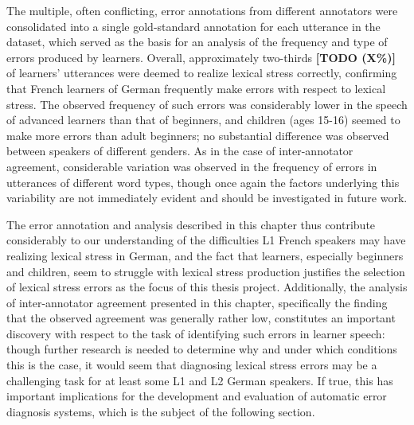\documentclass[11pt,a4paper,onecolumn]{article}
\newcommand{\TODO}[1]{{\color{red}\textbf{[TODO #1]}}}
\begin{document}
	The multiple, often conflicting, error annotations from different annotators were consolidated into a single gold-standard annotation for each utterance in the dataset, %
	which served as the basis for an analysis of the frequency and type of errors produced by learners. %
	Overall, approximately two-thirds \TODO{(X\%)} of learners' utterances were deemed to realize lexical stress correctly, confirming that French learners of German frequently make errors with respect to lexical stress. %
	The observed frequency of such errors was considerably lower in the speech of advanced learners than that of beginners, %
	and children (ages 15-16) seemed to make more errors than adult beginners; %
	no substantial difference was observed between speakers of different genders. 
	As in the case of inter-annotator agreement, considerable variation was observed in the frequency of errors in utterances of different word types, %
	though once again the factors underlying this variability are not immediately evident and should be investigated in future work. %
	
	The error annotation and analysis described in this chapter thus contribute considerably to our understanding of the difficulties L1 French speakers may have realizing lexical stress in 
	German, 
	and the fact that learners, especially beginners and children, seem to struggle with lexical stress production justifies the selection of lexical stress errors as the focus of this thesis project. Additionally, the analysis of inter-annotator agreement presented in this chapter, specifically the finding that the observed agreement was generally rather low,
	constitutes an important discovery with respect to the task of identifying such errors in learner speech:
	though further research is needed to determine why and under which conditions this is the case, %
	it would seem that diagnosing lexical stress errors may be a challenging task for at least some L1 and L2 German speakers. If true, this has important implications for the development and evaluation of automatic error diagnosis systems, 
	which is the subject of the following section.
\end{document}

